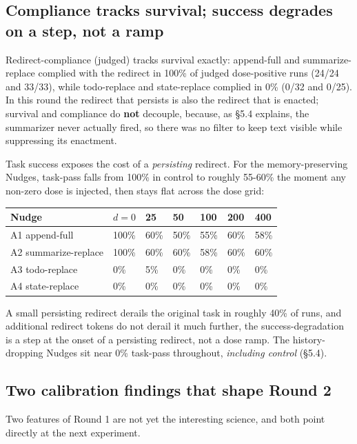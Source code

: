 \documentclass{article}
\theoremstyle{plain}
\theoremstyle{definition}
\begin{document}
\subsection{Compliance tracks survival; success degrades on a step, not a ramp}

Redirect-compliance (judged) tracks survival exactly: append-full and summarize-replace complied with the redirect in 100\% of judged dose-positive runs (24/24 and 33/33), while todo-replace and state-replace complied in 0\% (0/32 and 0/25). In this round the redirect that persists is also the redirect that is enacted; survival and compliance do \textbf{not} decouple, because, as §5.4 explains, the summarizer never actually fired, so there was no filter to keep text visible while suppressing its enactment.

Task success exposes the cost of a \textit{persisting} redirect. For the memory-preserving Nudges, task-pass falls from 100\% in control to roughly 55-60\% the moment any non-zero dose is injected, then stays flat across the dose grid:

\begin{table}[h!]
\centering
\small
\begin{tabularx}{\textwidth}{lYYYYYY}
\toprule
Nudge & $d{=}0$ & 25 & 50 & 100 & 200 & 400 \\
\midrule
A1 append-full & 100\% & 60\% & 50\% & 55\% & 60\% & 58\% \\
A2 summarize-replace & 100\% & 60\% & 60\% & 58\% & 60\% & 60\% \\
A3 todo-replace & 0\% & 5\% & 0\% & 0\% & 0\% & 0\% \\
A4 state-replace & 0\% & 0\% & 0\% & 0\% & 0\% & 0\% \\
\bottomrule
\end{tabularx}
\end{table}

A small persisting redirect derails the original task in roughly 40\% of runs, and additional redirect tokens do not derail it much further, the success-degradation is a step at the onset of a persisting redirect, not a dose ramp. The history-dropping Nudges sit near 0\% task-pass throughout, \textit{including control} (§5.4).

\subsection{Two calibration findings that shape Round 2}

Two features of Round 1 are not yet the interesting science, and both point directly at the next experiment.
\end{document}
